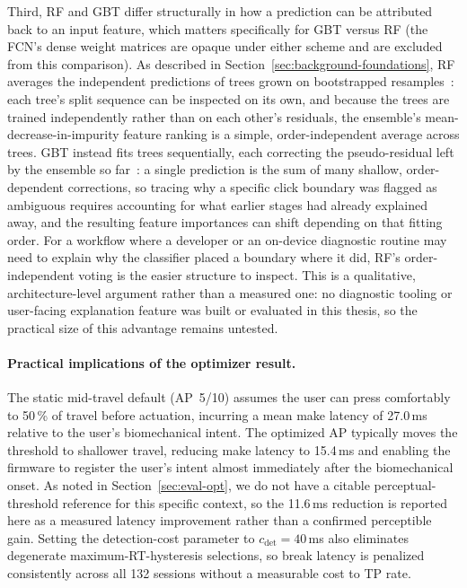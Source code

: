Third, RF and GBT differ structurally in how a prediction can be attributed
back to an input feature, which matters specifically for GBT versus RF (the
FCN's dense weight matrices are opaque under either scheme and are excluded
from this comparison). As described in
Section~\ref{sec:background-foundations}, RF averages the independent
predictions of trees grown on bootstrapped resamples~\cite{breiman_rf_2001}: each
tree's split sequence can be inspected on its own, and because the trees are
trained independently rather than on each other's residuals, the ensemble's
mean-decrease-in-impurity feature ranking is a simple, order-independent
average across trees. GBT instead fits trees sequentially, each correcting the
pseudo-residual left by the ensemble so far~\cite{friedman_gb_2001}: a single
prediction is the sum of many shallow, order-dependent corrections, so tracing
why a specific click boundary was flagged as ambiguous requires accounting for
what earlier stages had already explained away, and the resulting feature
importances can shift depending on that fitting order. For a workflow where a
developer or an on-device diagnostic routine may need to explain why the
classifier placed a boundary where it did, RF's order-independent voting is
the easier structure to inspect. This is a qualitative, architecture-level
argument rather than a measured one: no diagnostic tooling or user-facing
explanation feature was built or evaluated in this thesis, so the practical
size of this advantage remains untested.

\paragraph{Practical implications of the optimizer result.}
The static mid-travel default (AP~5/10) assumes the user can press comfortably to
50\,\% of travel before actuation, incurring a mean make latency of 27.0\,ms relative
to the user's biomechanical intent.  The optimized AP typically moves the threshold to
shallower travel, reducing make latency to 15.4\,ms and enabling the firmware to
register the user's intent almost immediately after the biomechanical onset.  As
noted in Section~\ref{sec:eval-opt}, we do not have a citable perceptual-threshold
reference for this specific context, so the 11.6\,ms reduction is reported here
as a measured latency improvement rather than a confirmed perceptible gain.
Setting the detection-cost parameter to $c_\text{det}=40$\,ms also eliminates
degenerate maximum-RT-hysteresis selections, so break latency is penalized
consistently across all 132 sessions without a measurable cost to TP rate.

